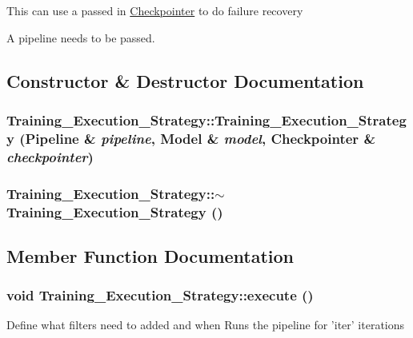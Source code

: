 This can use a passed in \hyperlink{class_checkpointer}{Checkpointer} to do failure recovery

A pipeline needs to be passed. 

\subsection{Constructor \& Destructor Documentation}
\hypertarget{class_training___execution___strategy_a3909c97f68df5715cb7dc55b81b8cf56}{
\subsubsection[{Training\_\-Execution\_\-Strategy}]{\setlength{\rightskip}{0pt plus 5cm}Training\_\-Execution\_\-Strategy::Training\_\-Execution\_\-Strategy ({\bf Pipeline} \& {\em pipeline}, \/  {\bf Model} \& {\em model}, \/  {\bf Checkpointer} \& {\em checkpointer})}}
\label{class_training___execution___strategy_a3909c97f68df5715cb7dc55b81b8cf56}
\hypertarget{class_training___execution___strategy_a5e833297a246164949efd7a6088b2bbd}{
\subsubsection[{$\sim$Training\_\-Execution\_\-Strategy}]{\setlength{\rightskip}{0pt plus 5cm}Training\_\-Execution\_\-Strategy::$\sim$Training\_\-Execution\_\-Strategy ()}}
\label{class_training___execution___strategy_a5e833297a246164949efd7a6088b2bbd}


\subsection{Member Function Documentation}
\hypertarget{class_training___execution___strategy_adc14f066d7a325e87035fb8224097c47}{
\subsubsection[{execute}]{\setlength{\rightskip}{0pt plus 5cm}void Training\_\-Execution\_\-Strategy::execute ()}}
\label{class_training___execution___strategy_adc14f066d7a325e87035fb8224097c47}
Define what filters need to added and when Runs the pipeline for 'iter' iterations 

